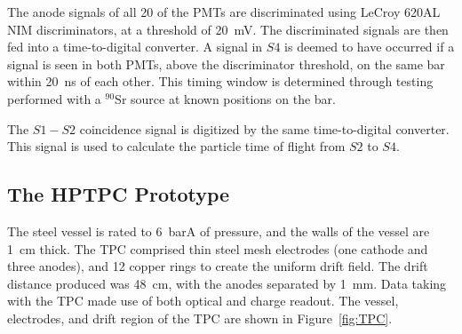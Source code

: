 The anode signals of all 20 of the PMTs are discriminated using LeCroy 620AL NIM discriminators, at a threshold of 20~mV.
The discriminated signals are then fed into a time-to-digital converter. A signal in $\mathit{S4}$ is deemed to have occurred if a signal is seen in both PMTs, above the discriminator threshold, on the same bar within 20~ns of each other. 
This timing window is determined through testing performed with a $^{90}$Sr source at known positions on the bar.

The $\mathit{S1-S2}$ coincidence signal is digitized by the same time-to-digital converter. This signal is used to calculate the particle time of flight from $\mathit{S2}$ to $\mathit{S4}$.

\subsection{The HPTPC Prototype}
The steel vessel is rated to 6~barA of pressure, and the walls of the vessel are 1~cm thick.
The TPC comprised thin steel mesh electrodes (one cathode and three anodes), and 12 copper rings to create the uniform drift field.
The drift distance produced was 48~cm, with the anodes separated by 1~mm. Data taking with the TPC made use of both optical and charge readout.
The vessel, electrodes, and drift region of the TPC are shown in Figure~\ref{fig:TPC}.

